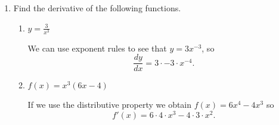 \documentclass[11pt]{article}
\begin{document}
\pagestyle{empty}
\newsavebox{\quizfront}
\begin{lrbox}{\quizfront}
\begin{minipage}[top][4.5in][t]{\textwidth} \setlength{\parindent}{1.5em}
\drawtitle
\vspace{-0.5in}
\begin{enumerate}

\item Find the derivative of the following functions.
  \begin{enumerate}
  \item $\displaystyle y=\frac{3}{x^3}$
    \vfill
    {\color{blue}

      We can use exponent rules to see that $y=3x^{-3}$, so
      \[
      \frac{dy}{dx} = 3\cdot -3\cdot x^{-4}.
      \]

    }
    \vfill
    
  \item $f(x)=x^{3}(6x-4)$
    \vfill
    {\color{blue}

      If we use the distributive property we obtain $f(x) = 6x^4 - 4x^3$
      so
      \[
      f'(x) = 6\cdot 4\cdot x^3 - 4\cdot 3\cdot x^2.
      \]

    }
    \vfill
    
  \end{enumerate}

\end{enumerate}


\end{minipage}
\end{lrbox}
\end{document}
